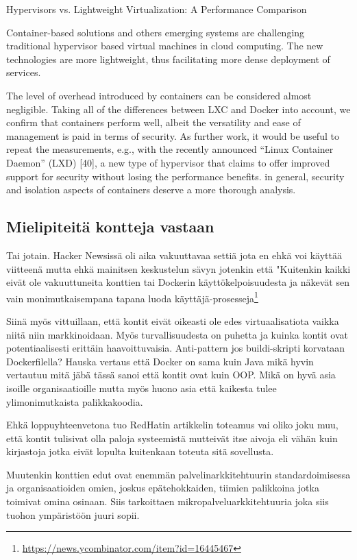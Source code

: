 \documentclass[finnish]{tktltiki2}
\theoremstyle{definition}
\theoremstyle{remark}
\begin{document}
Hypervisors vs. Lightweight Virtualization: A Performance Comparison

Container-based solutions and others emerging systems are challenging traditional hypervisor based virtual machines in cloud computing. The new technologies are more lightweight, thus facilitating more dense deployment of services.

The level of overhead introduced by containers can be considered almost negligible. Taking all of the differences between LXC and Docker into account, we confirm that containers perform well, albeit the versatility and ease of management is paid in terms of security. As further work, it would be useful to repeat the measurements, e.g., with the recently announced “Linux Container Daemon” (LXD) [40], a new type of hypervisor that claims to offer improved support for security without losing the performance benefits. in general, security and isolation aspects of containers deserve a more thorough analysis.\cite{hypervisors-vs-lightweight-virtualization}

\subsection{Mielipiteitä kontteja vastaan}

Tai jotain. Hacker Newsissä oli aika vakuuttavaa settiä jota en ehkä voi käyttää viitteenä mutta ehkä mainitsen keskustelun sävyn jotenkin että "Kuitenkin kaikki eivät ole vakuuttuneita konttien tai Dockerin käyttökelpoisuudesta ja näkevät sen vain monimutkaisempana tapana luoda käyttäjä-prosesseja\footnote{\url{https://news.ycombinator.com/item?id=16445467}}

Siinä myös vittuillaan, että kontit eivät oikeasti ole edes virtuaalisatiota vaikka niitä niin markkinoidaan. Myös turvallisuudesta on puhetta ja kuinka kontit ovat potentiaalisesti erittäin haavoittuvaisia. Anti-pattern jos buildi-skripti korvataan Dockerfilella? Hauska vertaus että Docker on sama kuin Java mikä hyvin vertautuu mitä jäbä tässä \cite{container-design-patterns} sanoi että kontit ovat kuin OOP. Mikä on hyvä asia isoille organisaatioille mutta myös huono asia että kaikesta tulee ylimonimutkaista palikkakoodia.

Ehkä loppuyhteenvetona tuo RedHatin artikkelin toteamus vai oliko joku muu, että kontit tulisivat olla paloja systeemistä mutteivät itse aivoja eli vähän kuin kirjastoja jotka eivät lopulta kuitenkaan toteuta sitä sovellusta.

Muutenkin konttien edut ovat enemmän palvelinarkkitehtuurin standardoimisessa ja organisaatioiden omien, joskus epätehokkaiden, tiimien palikkoina jotka toimivat omina osinaan. Siis tarkoittaen mikropalveluarkkitehtuuria joka siis tuohon ympäristöön juuri sopii.
\end{document}
